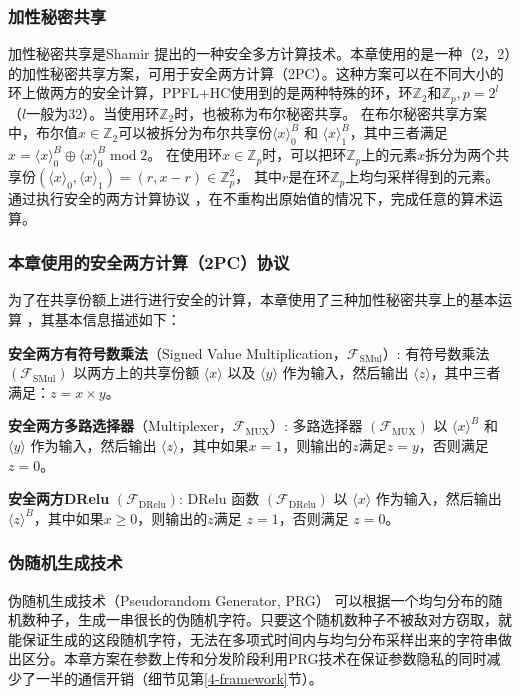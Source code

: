 \subsubsection{加性秘密共享}
加性秘密共享是Shamir \cite{shamir1979share} 提出的一种安全多方计算技术。本章使用的是一种（2，2）的加性秘密共享方案，可用于安全两方计算（2PC）。这种方案可以在不同大小的环上做两方的安全计算，PPFL+HC使用到的是两种特殊的环，环$\mathbb{Z}_2$和$\mathbb{Z}_p, p=2^l$（$l$一般为32）。当使用环$\mathbb{Z}_2$时，也被称为布尔秘密共享。
在布尔秘密共享方案中，布尔值$x \in \mathbb{Z}_2$可以被拆分为布尔共享份$\langle x\rangle_0^B$ 和 $\langle x\rangle_1^B$，其中三者满足$x = \langle x\rangle_0^B \oplus \langle x\rangle_0^B\;\text{mod}\;2$。
在使用环$x \in \mathbb{Z}_p$时，可以把环$\mathbb{Z}_p$上的元素$x$拆分为两个共享份$(\langle x\rangle_0, \langle x\rangle_1) = (r, x -r) \in \mathbb{Z}_p^2$， 其中$r$是在环$\mathbb{Z}_p$上均匀采样得到的元素。通过执行安全的两方计算协议 \cite{rathee2020cryptflow2, rathee2021sirnn}，在不重构出原始值的情况下，完成任意的算术运算。

\subsubsection{本章使用的安全两方计算（2PC）协议}
为了在共享份额上进行进行安全的计算，本章使用了三种加性秘密共享上的基本运算 \cite{rathee2021sirnn}，其基本信息描述如下：
\begin{compactitem}
    \item \textbf{安全两方有符号数乘法}（Signed Value Multiplication，$\mathcal{F}_{\text{SMul}}$）: 有符号数乘法 $(\mathcal{F}_{\text{SMul}})$ 以两方上的共享份额 $\langle x\rangle$ 以及 $\langle y\rangle$ 作为输入，然后输出 $\langle z\rangle$，其中三者满足：$z = x \times y$。
    \item \textbf{安全两方多路选择器}（Multiplexer，$\mathcal{F}_{\text{MUX}}$）: 多路选择器 $(\mathcal{F}_{\text{MUX}})$ 以 $\langle x\rangle^B$ 和 $\langle y\rangle$ 作为输入，然后输出 $\langle z\rangle$，其中如果$x = 1$，则输出的$z$满足$z = y$，否则满足$z = 0$。 
    \item \textbf{安全两方DRelu} $(\mathcal{F}_{\text{DRelu}})$: DRelu 函数 $(\mathcal{F}_{\text{DRelu}})$ 以 $\langle x\rangle$ 作为输入，然后输出 $\langle z\rangle^B$，其中如果$x \geq 0$，则输出的$z$满足 $z = 1$，否则满足 $z = 0$。
\end{compactitem}

\subsubsection{伪随机生成技术}
伪随机生成技术（Pseudorandom Generator, PRG）\cite{yao1982theory} 可以根据一个均匀分布的随机数种子，生成一串很长的伪随机字符。只要这个随机数种子不被敌对方窃取，就能保证生成的这段随机字符，无法在多项式时间内与均匀分布采样出来的字符串做出区分。本章方案在参数上传和分发阶段利用PRG技术在保证参数隐私的同时减少了一半的通信开销（细节见第\ref{4-framework}节）。

